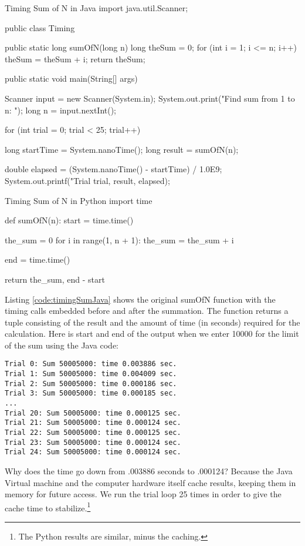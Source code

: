 \begin{javacode}[label={code:timingSumJava}]{Timing Sum of N in Java}
import java.util.Scanner;

public class Timing {
	public static long sumOfN(long n) {
		long theSum = 0;
		for (int i = 1; i <= n; i++) {
			theSum = theSum + i;
		}
		return theSum;
	}
	
	public static void main(String[] args) {
		
		Scanner input = new Scanner(System.in);
		System.out.print("Find sum from 1 to n: ");
		long n = input.nextInt();
		
		for (int trial = 0; trial < 25; trial++) {
			long startTime = System.nanoTime();
			long result = sumOfN(n);
			
			double elapsed = (System.nanoTime() - startTime) / 1.0E9;
			System.out.printf("Trial %
			trial, result, elapsed);
		}
	}
}
\end{javacode}


\begin{pycode}[label={code:timingSumPython}]{Timing Sum of N in Python}
import time

def sumOfN(n):
	start = time.time()
	
	the_sum = 0
	for i in range(1, n + 1):
		the_sum = the_sum + i
		
	end = time.time()

return the_sum, end - start

\end{pycode}

Listing \ref{code:timingSumJava} shows the original sumOfN function with the timing calls embedded before and after the summation. The function returns a tuple consisting of the result and the amount of time (in seconds) required for the calculation. Here is start and end of the output when we enter 10000 for the limit of the sum using the Java code:

\begin{verbatim}
Trial 0: Sum 50005000: time 0.003886 sec.
Trial 1: Sum 50005000: time 0.004009 sec.
Trial 2: Sum 50005000: time 0.000186 sec.
Trial 3: Sum 50005000: time 0.000185 sec.
...
Trial 20: Sum 50005000: time 0.000125 sec.
Trial 21: Sum 50005000: time 0.000124 sec.
Trial 22: Sum 50005000: time 0.000125 sec.
Trial 23: Sum 50005000: time 0.000124 sec.
Trial 24: Sum 50005000: time 0.000124 sec.
\end{verbatim}


Why does the time go down from .003886 seconds to .000124? Because the Java Virtual machine and the computer hardware itself cache results, keeping them in memory for future access. We run the trial loop 25 times in order to give the cache time to stabilize.\footnote{The Python results are similar, minus the caching.}

